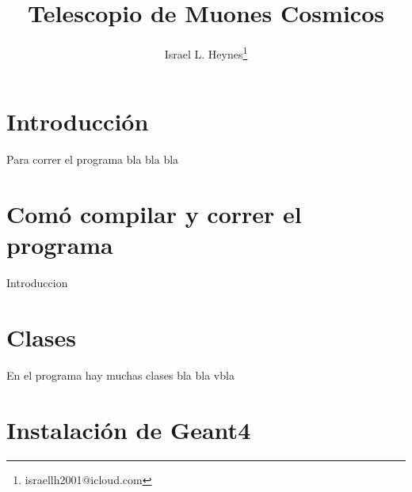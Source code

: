 \documentclass[a4paper,10pt]{article}
\author{Israel L. Heynes\thanks{israellh2001@icloud.com}}
\title{Telescopio de Muones Cosmicos}
\begin{document}
    \maketitle
    \tableofcontents

    \section{Introducción}
        Para correr el programa bla bla bla

    \section{Comó compilar y correr el programa}
        Introduccion

    \section{Clases}
        En el programa hay muchas clases bla bla vbla

    \appendix
        \section{Instalación de Geant4}
\end{document}
